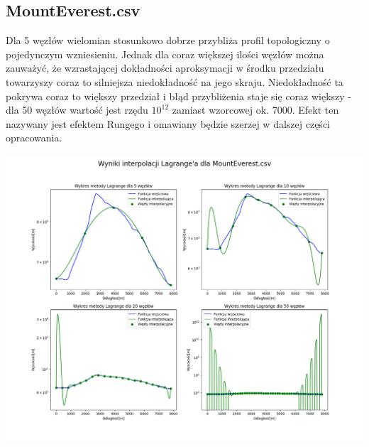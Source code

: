 \documentclass[a4paper,12pt]{article}
\begin{document}
	\subsection{MountEverest.csv}
	Dla 5 węzłów wielomian stosunkowo dobrze przybliża profil topologiczny o pojedynczym wzniesieniu. Jednak dla coraz większej ilości węzłów można zauważyć, że wzrastającej dokładności aproksymacji w środku przedziału towarzyszy coraz to silniejsza niedokładność na jego skraju. Niedokładność ta pokrywa coraz to większy przedział i błąd przybliżenia staje się coraz większy - dla 50 węzłów wartość jest rzędu $10^12$ zamiast wzorcowej ok. 7000. Efekt ten nazywany jest efektem Rungego i omawiany będzie szerzej w dalszej części opracowania.
	\begin{center}
        \includegraphics[scale=0.4]{../charts/lagrange_MountEverest.png}
    \end{center}
	
	\newpage
\end{document}
